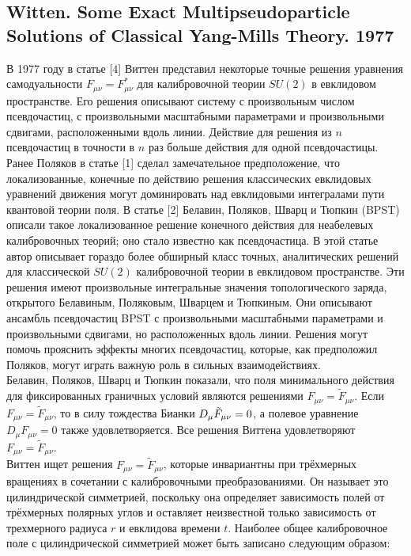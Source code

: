 \documentclass[12pt]{article}
\theoremstyle{definition}
\begin{document}
\subsection{Witten. Some Exact Multipseudoparticle Solutions of Classical Yang-Mills Theory. 1977}
В 1977 году в статье [4] Виттен представил некоторые точные решения уравнения самодуальности $F_{\mu\nu}=F^*_{\mu\nu}$ для калибровочной теории $SU(2)$ в евклидовом пространстве. Его решения описывают систему с произвольным числом псевдочастиц, с произвольными масштабными параметрами и произвольными сдвигами, расположенными вдоль линии. Действие для решения из $n$ псевдочастиц в точности в $n$ раз больше действия для одной псевдочастицы.\\
Ранее Поляков в статье [1] сделал замечательное предположение, что локализованные, конечные по действию решения классических евклидовых уравнений движения могут доминировать над евклидовыми интегралами пути квантовой теории поля. В статье [2] Белавин, Поляков, Шварц и Тюпкин (BPST) описали такое локализованное решение конечного действия для неабелевых калибровочных теорий; оно стало известно как псевдочастица.
В этой статье автор описывает гораздо более обширный класс точных, аналитических решений для классической $SU(2)$ калибровочной теории в евклидовом пространстве. Эти решения имеют произвольные интегральные значения топологического заряда, открытого Белавиным, Поляковым, Шварцем и Тюпкиным. Они описывают ансамбль псевдочастиц BPST с произвольными масштабными параметрами и произвольными сдвигами, но расположенных вдоль линии. Решения могут помочь прояснить эффекты многих псевдочастиц, которые, как предположил Поляков, могут играть важную роль в сильных взаимодействиях.\\
Белавин, Поляков, Шварц и Тюпкин показали, что поля минимального действия для фиксированных граничных условий являются решениями $F_{\mu\nu}=\tilde{F}_{\mu\nu}$. Если $F_{\mu\nu}=\tilde{F}_{\mu\nu}$, то в силу тождества Бианки $D_\mu\Tilde{F}_{\mu\nu}=0$, а полевое уравнение $D_\mu F_{\mu\nu}=0$ также удовлетворяется. Все решения Виттена удовлетворяют $F_{\mu\nu}=\tilde{F}_{\mu\nu}$.\\
Виттен ищет решения $F_{\mu\nu}=\tilde{F}_{\mu\nu}$, которые инвариантны при трёхмерных вращениях в сочетании с калибровочными преобразованиями. Он называет это цилиндрической симметрией, поскольку она определяет зависимость полей от трёхмерных полярных углов и оставляет неизвестной только зависимость от трехмерного радиуса $r$ и евклидова времени $t$. Наиболее общее калибровочное поле с цилиндрической симметрией может быть записано следующим образом:
\end{document}
